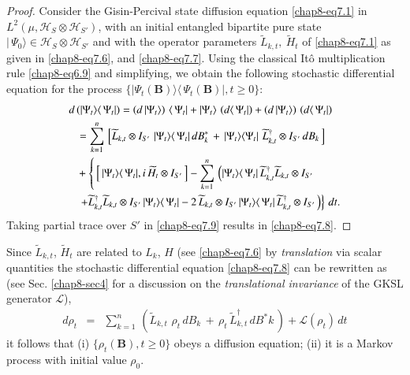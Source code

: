 \begin{proof}
Consider the Gisin-Percival state diffusion equation \eqref{chap8-eq7.1} in\break $L^2(\mu, \mathcal{H}_S\otimes\mathcal{H}_{S'})$, with an initial entangled bipartite pure state $\vert\,\Psi_0\rangle\in \mathcal{H}_S\otimes\mathcal{H}_{S'}$ and with the operator parameters  $\widetilde{L}_{k,t},\  \widetilde{H}_t$ of 
\eqref{chap8-eq7.1} as given in \eqref{chap8-eq7.6}, and \eqref{chap8-eq7.7}. Using the classical It{\^o} multiplication rule  \eqref{chap8-eq6.9} and simplifying, we obtain the following stochastic differential equation for the process $\{\vert\Psi_t(\mathbf{B})\rangle\langle\, \Psi_t(\mathbf{B})\vert, t\geq 0\}$:  
\begin{align}
		d\, & (\vert\Psi_t\rangle  \langle\, \Psi_t\vert)= \left( d\, \vert\Psi_t\rangle\right)\, \langle\,\Psi_t\vert+ \vert\Psi_t\rangle\, \left(d\langle\, \Psi_t\vert\right) + \left( d\, \vert\Psi_t\rangle\right)\,  \left(d\langle\, \Psi_t\vert\right) \notag\\
		&= \sum_{k=1}^{n}\,\left[\widetilde{L}_{k,t}\otimes I_{S'}\,\, \vert\Psi_t\rangle\langle\, \Psi_t\vert\, dB^*_{k}\, + \, \vert\Psi_t\rangle\langle \Psi_t\vert\,\,\widetilde{L}^\dag_{k,t}\otimes I_{S'}\,  dB_{k}\,\right]  \notag\\ 
		&+ \left\{\,  \left[\,\vert\Psi_t\rangle\langle\, \Psi_t\vert, i\, \widetilde{H}_{t}\otimes I_{S'}\, \right]  - \sum_{k=1}^{n}\, \left( \vert\Psi_t\rangle\langle\, \Psi_t\vert\, \widetilde{L}^\dag_{k,t} \widetilde{L}_{k,t}\otimes I_{S'} \right. \right. \notag\\ 
		&\left. \left. +\widetilde{L}^{\dag}_{k,t} \widetilde{L}_{k,t}\otimes I_{S'}\, \vert\Psi_t\rangle\langle\, \Psi_t\vert - 2\, \widetilde{L}_{k,t}\otimes I_{S'}\, \vert\Psi_t\rangle\langle\, \Psi_t\vert\, \widetilde{L}^\dag_{k,t}\otimes I_{S'}\,\right)\right\}\, dt. \label{chap8-eq7.9}
\end{align}
Taking partial trace  over $S'$ in \eqref{chap8-eq7.9} results in \eqref{chap8-eq7.8}.
\end{proof}

\begin{remark}
Since $\widetilde{L}_{k,t}$, $\widetilde{H}_t$ are related to $L_k$, $H$ (see \eqref{chap8-eq7.6} by {\em translation}  via scalar quantities the stochastic differential equation \eqref{chap8-eq7.8} can be rewritten as  (see Sec. \ref{chap8-sec4}  for a discussion on the {\em translational invariance} of the GKSL generator $\mathcal{L}$),
\begin{eqnarray}
d\rho_t &=& \sum_{k=1}^{n}\,\left( \widetilde{L}_{k,t}\,\, \rho_t\, dB_{k}\, + \, \rho_t\,\widetilde{L}^\dag_{k,t}\, dB^*{k}\,\right) + \mathcal{L}(\rho_t)\, dt \label{chap8-eq7.10}
\end{eqnarray}
it follows that (i) $\{\rho_t(\mathbf{B}),t\geq 0\}$  obeys a diffusion equation; (ii) it is a Markov process with initial value $\rho_0$. 
\end{remark}

